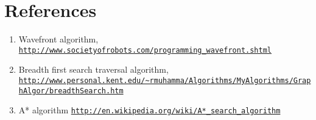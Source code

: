 \documentclass{report}
\begin{document}
\section{References}
	\begin{enumerate}
	\item Wavefront algorithm, \href{http://www.societyofrobots.com/programming_wavefront.shtml}{\nolinkurl{http://www.societyofrobots.com/programming_wavefront.shtml}}
	\item Breadth first search traversal algorithm, \href{http://www.personal.kent.edu/~rmuhamma/Algorithms/MyAlgorithms/GraphAlgor/breadthSearch.htm}{\nolinkurl{http://www.personal.kent.edu/~rmuhamma/Algorithms/MyAlgorithms/GraphAlgor/breadthSearch.htm}}
	\item A* algorithm \href{http://en.wikipedia.org/wiki/A*_search_algorithm}{\nolinkurl{http://en.wikipedia.org/wiki/A*_search_algorithm}}
	\end{enumerate}
\end{document}
